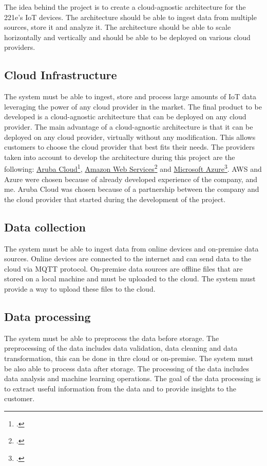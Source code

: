 The idea behind the project is to create a cloud-agnostic architecture for the 221e's IoT devices. The architecture should be able to ingest data from multiple sources, store it and  analyze it. The architecture should be able to scale horizontally and vertically and should be able to be deployed on various cloud providers.

\subsection{Cloud Infrastructure}
The system must be able to ingest, store and process large amounts of IoT data leveraging the power of any cloud provider in the market. The final product to be developed is a cloud-agnostic architecture that can be deployed on any cloud provider. The main advantage of a cloud-agnostic architecture is that it can be deployed on any cloud provider, virtually without any modification. This allows customers to choose the cloud provider that best fits their needs.
The providers taken into account to develop the architecture during this project are the following: \href{https://www.arubacloud.com/}{Aruba Cloud}\footcite{site:aruba-cloud}, \href{https://aws.amazon.com/it/}{Amazon Web Services}\footcite{site:aws} and \href{https://azure.microsoft.com/it-it/}{Microsoft Azure}\footcite{site:azure}. 
AWS and Azure were chosen because of already developed experience of the company, and me. Aruba Cloud was chosen because of a partnership between the company and the cloud provider that started during the development of the project.\\


\subsection{Data collection}
The system must be able to ingest data from online devices and on-premise data sources. 
Online devices are connected to the internet and can send data to the cloud via MQTT protocol.
On-premise data sources are offline files that are stored on a local machine and must be uploaded to the cloud. The system must provide a way to upload these files to the cloud.
\subsection{Data processing}
The system must be able to preprocess the data before storage. The preprocessing of the data includes data validation, data cleaning and data transformation, this can be done in thre cloud or on-premise. The system must be also able to process data after storage. The processing of the data includes data analysis and machine learning operations. The goal of the data processing is to extract useful information from the data and to provide insights to the customer.\\ 

